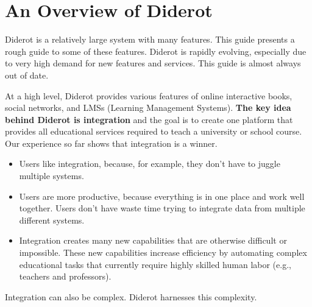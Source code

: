 \chapter{An Overview of Diderot}
\label{ch:overview}

\begin{gram}
\label{ch:overview::intro}
Diderot is a relatively large system with many features. This guide presents a rough guide to some of these features.  Diderot is rapidly evolving, especially due to very high demand for new features and services. This guide is almost always out of date.
\end{gram}

\begin{gram}
\label{ch:overview::features}
At a high level, Diderot provides various features of online interactive books,  social networks, and LMSs (Learning Management Systems).
%
\textbf{The key idea behind Diderot is integration} and the goal is to
create one platform that provides all educational services required to
teach a university or school course.
%
Our experience so far shows that integration is a winner.
\begin{itemize}
\item Users like integration, because, for example, they don't have to juggle multiple systems.

\item Users are more productive, because everything is in one place and
  work well together. Users don't have waste time trying to
  integrate data from multiple different systems.

\item Integration creates many new capabilities that are otherwise
  difficult or impossible.  These new capabilities increase efficiency
  by automating complex educational tasks that currently require
  highly skilled human labor (e.g., teachers and professors).
  
\end{itemize}
%

Integration can also be complex. Diderot harnesses this complexity.


\end{gram}

